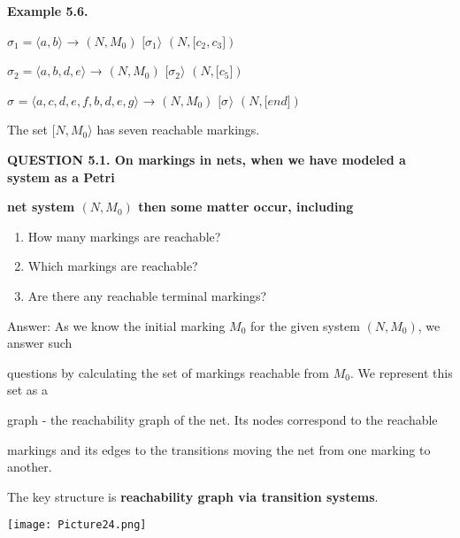 \documentclass[a4paper]{article}
\begin{document}
\par\null\par

\textbf{\newline Example 5.6.}\par
$\sigma_{1} = \langle{}a,b\rangle{}$ → $(N, M_0)$
$[\sigma_{1} \rangle{}$ $(N, \lbrack c_2, c_3\rbrack)$\par
$\sigma_{2} = \langle{}a,b,d,e\rangle{}$ → $(N, M_0)$
$[\sigma_{2} \rangle{}$ $(N, \lbrack c_5\rbrack)$\par
$\sigma_{} = \langle{}a,c,d,e,f,b,d,e,g\rangle{}$ → $(N, M_0)$
$[\sigma_{} \rangle{}$ $(N, {\lbrack end}\rbrack)$\par
The set $[N, M_0\rangle{}$ has seven reachable markings.
\par\null\par

\textbf{QUESTION 5.1. On markings in nets, when we have modeled a system as a Petri}\par
\textbf{net system $(N, M_0)$ then some matter occur, including}\par
\begin{enumerate}
    \item How many markings are reachable?
    \item Which markings are reachable?
    \item Are there any reachable terminal markings?
\end{enumerate}
\par
Answer: As we know the initial marking $M_0$ for the given system $(N, M_0)$, we answer such\par questions by calculating the set of markings reachable from $M_0$. We represent this set as a\par
graph - the reachability graph of the net. Its nodes correspond to the reachable\par
markings and its edges to the transitions moving the net from one marking to another.\par 
The key structure is \textbf{reachability graph via transition systems}.
\par\null\par

\begin{center}
    \texttt{[image: Picture24.png]}
\end{center}
\end{document}
